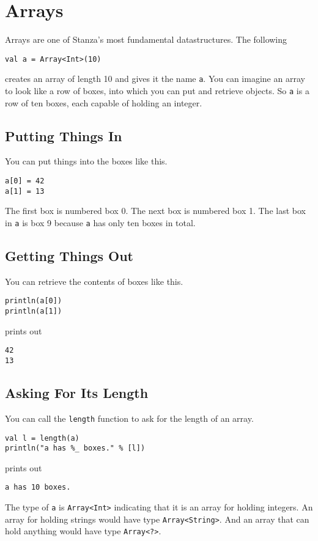 \documentclass[10pt,oneside]{book}
\begin{document}
\section{Arrays}

Arrays are one of Stanza's most fundamental datastructures. The following
\begin{lstlisting}
val a = Array<Int>(10)
\end{lstlisting}
creates an array of length 10 and gives it the name \texttt{\frenchspacing a}. You can imagine an array to look like a row of boxes, into which you can put and retrieve objects. So \texttt{\frenchspacing a} is a row of ten boxes, each capable of holding an integer.

\subsection*{Putting Things In}
You can put things into the boxes like this.
\begin{lstlisting}
a[0] = 42
a[1] = 13
\end{lstlisting}
The first box is numbered box 0. The next box is numbered box 1. The last box in \texttt{\frenchspacing a} is box 9 because \texttt{\frenchspacing a} has only ten boxes in total. 

\subsection*{Getting Things Out}
You can retrieve the contents of boxes like this.
\begin{lstlisting}
println(a[0])
println(a[1])
\end{lstlisting}
prints out
\begin{lstlisting}
42
13
\end{lstlisting}

\subsection*{Asking For Its Length}
You can call the \texttt{\frenchspacing length} function to ask for the length of an array.
\begin{lstlisting}
val l = length(a)
println("a has %_ boxes." % [l])
\end{lstlisting}
prints out
\begin{lstlisting}
a has 10 boxes.
\end{lstlisting}

The type of \texttt{\frenchspacing a} is \texttt{\frenchspacing Array<Int>} indicating that it is an array for holding integers. An array for holding strings would have type \texttt{\frenchspacing Array<String>}. And an array that can hold anything would have type \texttt{\frenchspacing Array<?>}. 
\end{document}
